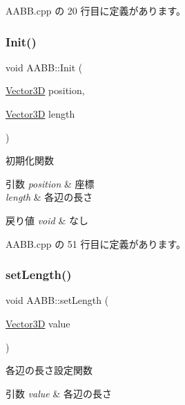  A\+A\+B\+B.\+cpp の 20 行目に定義があります。

\mbox{\label{class_a_a_b_b_a28167704c3b21de2ae9f70ac139781c4}} 
\subsubsection{\texorpdfstring{Init()}{Init()}}
{\footnotesize\ttfamily void A\+A\+B\+B\+::\+Init (\begin{DoxyParamCaption}\item[{\mbox{\hyperlink{class_vector3_d}{Vector3D}}}]{position,  }\item[{\mbox{\hyperlink{class_vector3_d}{Vector3D}}}]{length }\end{DoxyParamCaption})}



初期化関数 


\begin{DoxyParams}{引数}
{\em position} & 座標 \\
\hline
{\em length} & 各辺の長さ \\
\hline
\end{DoxyParams}

\begin{DoxyRetVals}{戻り値}
{\em void} & なし \\
\hline
\end{DoxyRetVals}


 A\+A\+B\+B.\+cpp の 51 行目に定義があります。

\mbox{\label{class_a_a_b_b_a76816b1eb872408d91dfa6880e5af109}} 
\subsubsection{\texorpdfstring{set\+Length()}{setLength()}}
{\footnotesize\ttfamily void A\+A\+B\+B\+::set\+Length (\begin{DoxyParamCaption}\item[{\mbox{\hyperlink{class_vector3_d}{Vector3D}}}]{value }\end{DoxyParamCaption})}



各辺の長さ設定関数 


\begin{DoxyParams}{引数}
{\em value} & 各辺の長さ \\
\hline
\end{DoxyParams}

